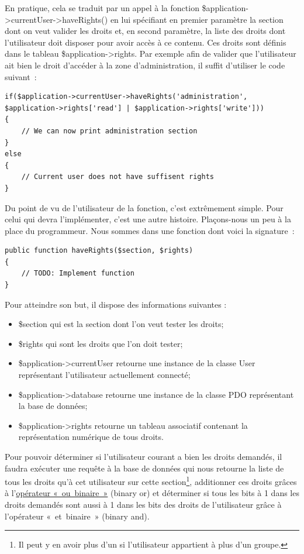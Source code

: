 \documentclass[letter, 11pt]{report}
\begin{document}
En pratique, cela se traduit par un appel à la fonction \$application->currentUser->haveRights() en lui spécifiant en premier paramètre la section dont on veut valider les droits et, en second paramètre, la liste des droits dont l'utilisateur doit disposer pour avoir accès à ce contenu. Ces droits sont définis dans le tableau \$application->rights. Par exemple afin de valider que l'utilisateur ait bien le droit d'accéder à la zone d'administration, il suffit d'utiliser le code suivant~:

\begin{lstlisting}[style=php]
if($application->currentUser->haveRights('administration', $application->rights['read'] | $application->rights['write']))
{
	// We can now print administration section
}
else
{
	// Current user does not have suffisent rights
}
\end{lstlisting}

Du point de vu de l'utilisateur de la fonction, c'est extrêmement simple. Pour celui qui devra l'implémenter, c'est une autre histoire. Plaçons-nous un peu à la place du programmeur. Nous sommes dans une fonction dont voici la signature~:

\begin{lstlisting}[style=php]
public function haveRights($section, $rights)
{
	// TODO: Implement function
}
\end{lstlisting}

Pour atteindre son but, il dispose des informations suivantes :

\begin{itemize}
	\item \$section qui est la section dont l'on veut tester les droits;
	\item \$rights qui sont les droits que l'on doit tester;
	\item \$application->currentUser retourne une instance de la classe User représentant l'utilisateur actuellement connecté;
	\item \$application->database retourne une instance de la classe PDO représentant la base de données;
	\item \$application->rights retourne un tableau associatif contenant la représentation numérique de tous droits.
\end{itemize}

Pour pouvoir déterminer si l'utilisateur courant a bien les droits demandés, il faudra exécuter une requête à la base de données qui nous retourne la liste de tous les droits qu'à cet utilisateur sur cette section\footnote{Il peut y en avoir plus d'un si l'utilisateur appartient à plus d'un groupe.}, additionner ces droits grâces à l'\href{http://www.php.net/manual/en/language.operators.bitwise.php}{opérateur «~ou~binaire~»} (binary or) et déterminer si tous les bits à 1 dans les droits demandés sont aussi à 1 dans les bits des droits de l'utilisateur grâce à l'opérateur «~et~binaire~» (binary and).
\end{document}
